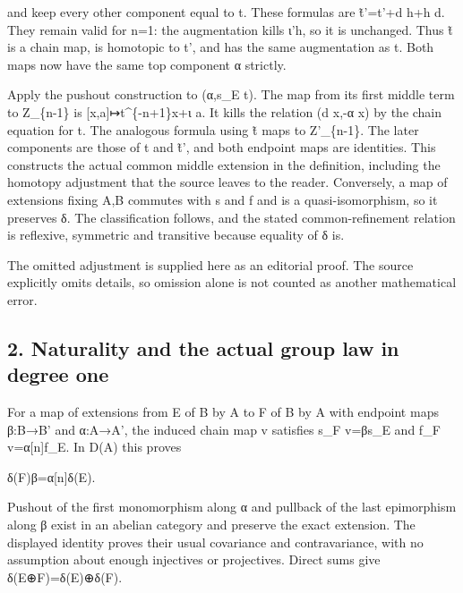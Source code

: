 and keep every other component equal to t\textquotesingle. These formulas are t̃'\allowbreak{}=t'\allowbreak{}+d h\allowbreak{}+h d. They remain valid for n\allowbreak{}=1:\allowbreak{} the augmentation kills ι'h,\allowbreak{} so it is unchanged. Thus t̃\textquotesingle{} is a chain map,\allowbreak{} is homotopic to t',\allowbreak{} and has the same augmentation as t. Both maps now have the same top component α strictly.

Apply the pushout construction to (α,\allowbreak{}s\_\allowbreak{}E t)\allowbreak{}. The map from its first middle term to Z\_\allowbreak{}\{n-1\} is [x,\allowbreak{}a]\allowbreak{}\allowbreak{}↦t\textasciicircum{}\{-n\allowbreak{}+1\}x\allowbreak{}+ι a. It kills the relation (d x,\allowbreak{}-α x)\allowbreak{} by the chain equation for t. The analogous formula using t̃\textquotesingle{} maps to Z'\_\allowbreak{}\{n-1\}. The later components are those of t and t̃',\allowbreak{} and both endpoint maps are identities. This constructs the actual common middle extension in the definition,\allowbreak{} including the homotopy adjustment that the source leaves to the reader. Conversely,\allowbreak{} a map of extensions fixing A,\allowbreak{}B commutes with s and f and is a quasi-isomorphism,\allowbreak{} so it preserves δ. The classification follows,\allowbreak{} and the stated common-refinement relation is reflexive,\allowbreak{} symmetric and transitive because equality of δ is.

The omitted adjustment is supplied here as an editorial proof. The source explicitly omits details,\allowbreak{} so omission alone is not counted as another mathematical error.

\subsection{2. Naturality and the actual group law in degree one}\label{proofs-8774-9196-naturality-and-the-actual-group-law-in-degree-one}

For a map of extensions from E of B by A to F of B\textquotesingle{} by A\textquotesingle{} with endpoint maps β:\allowbreak{}B\allowbreak{}→B' and α:\allowbreak{}A\allowbreak{}→A',\allowbreak{} the induced chain map v satisfies s\_\allowbreak{}F v\allowbreak{}=βs\_\allowbreak{}E and f\_\allowbreak{}F v\allowbreak{}=α[n]\allowbreak{}f\_\allowbreak{}E. In D(A)\allowbreak{} this proves

δ(F)\allowbreak{}β\allowbreak{}=α[n]\allowbreak{}δ(E)\allowbreak{}.

Pushout of the first monomorphism along α and pullback of the last epimorphism along β exist in an abelian category and preserve the exact extension. The displayed identity proves their usual covariance and contravariance,\allowbreak{} with no assumption about enough injectives or projectives. Direct sums give δ(E\allowbreak{}⊕F)\allowbreak{}\allowbreak{}=δ(E)\allowbreak{}\allowbreak{}⊕δ(F)\allowbreak{}.

